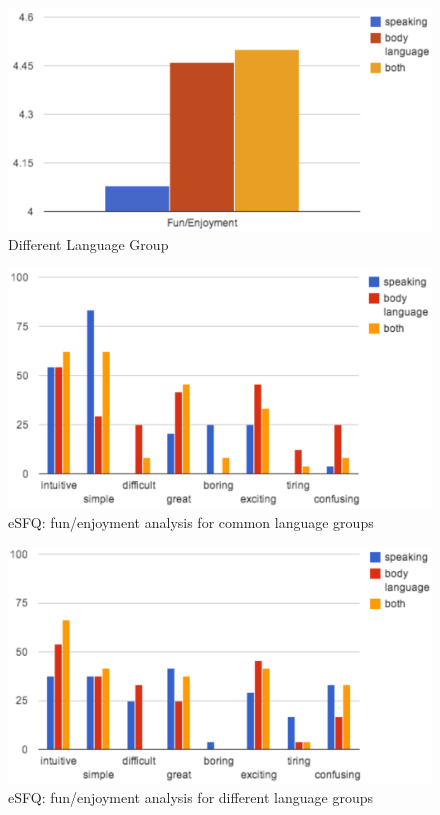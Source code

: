 \begin{figure}[!h]
\centering
\includegraphics[width=0.9\columnwidth]{Figures/US_Fun_Dif.png}
\caption{Different Language Group}
\label{fig:US_Fun_Dif}
\end{figure}

\begin{figure}[!h]
\centering
\includegraphics[width=0.9\columnwidth]{Figures/US_eSFQ_Com_Fun.png}
\caption{eSFQ: fun/enjoyment analysis for common language groups}
\label{fig:US_eSFQ_Com_Fun}
\end{figure}

\begin{figure}[!h]
\centering
\includegraphics[width=0.9\columnwidth]{Figures/US_eSFQ_Dif_Fun.png}
\caption{eSFQ: fun/enjoyment analysis for different language groups}
\label{fig:US_eSFQ_Dif_Fun}
\end{figure}

